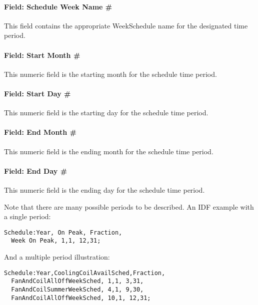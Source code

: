 \paragraph{Field: Schedule Week Name \#}\label{field-schedule-week-name}

This field contains the appropriate WeekSchedule name for the designated time period.

\paragraph{Field: Start Month \#}\label{field-start-month}

This numeric field is the starting month for the schedule time period.

\paragraph{Field: Start Day \#}\label{field-start-day}

This numeric field is the starting day for the schedule time period.

\paragraph{Field: End Month \#}\label{field-end-month-000}

This numeric field is the ending month for the schedule time period.

\paragraph{Field: End Day \#}\label{field-end-day}

This numeric field is the ending day for the schedule time period.

Note that there are many possible periods to be described. An IDF example with a single period:

\begin{lstlisting}
Schedule:Year, On Peak, Fraction,
  Week On Peak, 1,1, 12,31;
\end{lstlisting}

And a multiple period illustration:

\begin{lstlisting}
Schedule:Year,CoolingCoilAvailSched,Fraction,
  FanAndCoilAllOffWeekSched, 1,1, 3,31,
  FanAndCoilSummerWeekSched, 4,1, 9,30,
  FanAndCoilAllOffWeekSched, 10,1, 12,31;
\end{lstlisting}

